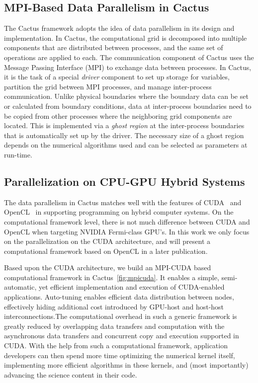 \documentclass{IOS-Book-Article}
\begin{document}
\subsection{MPI-Based Data Parallelism in Cactus}
The Cactus framework adopts the idea of data parallelism in its design
and implementation.
In Cactus, the computational grid is decomposed into multiple
components that are distributed between processes, and the same
set of operations are applied to each.
The communication component of Cactus uses the Message Passing Interface (MPI)
to exchange data between processes.
In Cactus, it is the task of a special \emph{driver} component to set up
storage for variables, partition the grid between MPI processes, and
manage inter-process 
communication. Unlike physical boundaries where the boundary data can be set or
calculated
from boundary conditions, data at inter-process boundaries need to be
copied from
other processes where the neighboring grid components are located.
This is implemented via a \emph{ghost region}
at the inter-process boundaries that is
automatically set up by the driver.
The necessary size of a ghost region depends on the numerical
algorithms used and can be selected as parameters at run-time.


\subsection{Parallelization on CPU-GPU Hybrid Systems}
The data parallelism in Cactus matches well with the features of
CUDA~\cite{cudasite} and OpenCL~\cite{openclsite} in supporting
programming on hybrid computer systems. On the computational framework
level, there is not much difference between CUDA and OpenCL when 
targeting NVIDIA Fermi-class GPU's. 
In this work we only focus on the parallelization on the CUDA architecture,
and will present a computational framework based on OpenCL in a later
publication.

Based upon the CUDA architecture, we build an MPI-CUDA based
computational framework
in Cactus~\ref{fig:mpicuda}. 
It enables a simple, semi-automatic, yet efficient implementation
and execution of CUDA-enabled applications. Auto-tuning enables
efficient data distribution
between nodes, effectively hiding additional
cost introduced by GPU-host and host-host interconnections.The computational overhead in such a generic framework is greatly
reduced by overlapping data transfers
and computation with the asynchronous data transfers and concurrent
copy and execution supported in CUDA\@.
With the help from such a computational framework, application
developers can then spend more time
optimizing the numerical kernel itself, implementing more
efficient algorithms in these kernels, and (most importantly)
advancing the science content in their code.
\end{document}
